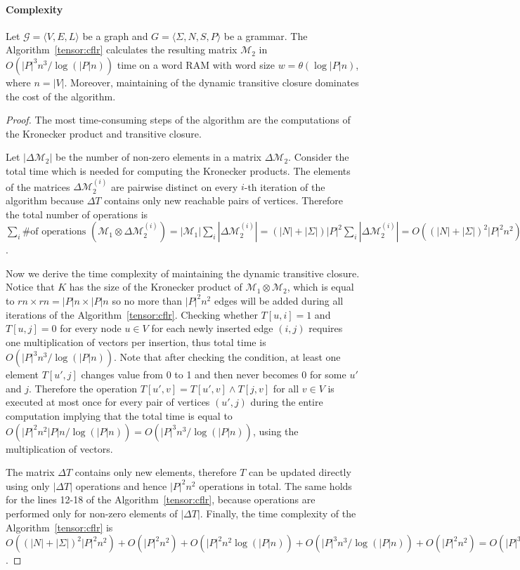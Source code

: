 \paragraph*{Complexity}

\begin{theorem}{}
\label{theorem: subcubic}
    Let $\mathcal{G} = \langle V,E,L \rangle$ be a graph and $G = \langle\Sigma, N, S, P\rangle$ be a grammar.
    The Algorithm~\ref{tensor:cflr} calculates the resulting matrix $\mathcal{M}_2$ in $O({|P|}^3n^3/\log (|P|n))$ time on a word RAM with word size $w= \theta(\log |P|n)$, where $n = |V|$. Moreover, maintaining of the dynamic transitive closure dominates the cost of the algorithm.
\end{theorem}


\begin{proof}
The most time-consuming steps of the algorithm are the computations of the Kronecker product and transitive closure.

 Let $|\Delta\mathcal{M}_2|$ be the number of non-zero elements in a matrix $\Delta\mathcal{M}_2$. Consider the total time which is needed for computing the Kronecker products. The elements of the matrices $\Delta\mathcal{M}_2^{(i)}$ are pairwise distinct on every $i$-th iteration of the algorithm because $\Delta T$ contains only new reachable pairs of vertices.  Therefore the total number of operations is $\sum\limits_i{\text{\# of operations }(\mathcal{M}_1 \otimes \Delta\mathcal{M}_2^{(i)})} = |\mathcal{M}_1| \sum\limits_i {|\Delta\mathcal{M}_2^{(i)}|} = (|N| + |\Sigma|){|P|}^2 \sum\limits_i {|\Delta\mathcal{M}_2^{(i)}|} = O({(|N| + |\Sigma|)}^2{|P|}^2 n^2)$.

Now we derive the time complexity of maintaining the dynamic transitive closure.
Notice that $K$ has the size of the Kronecker product of $\mathcal{M}_1 \otimes \mathcal{M}_2$, which is equal to $r n \times r n = |P|n \times |P|n$ so no more than ${|P|}^2n^2$ edges will be added during all iterations of the Algorithm~\ref{tensor:cflr}.
Checking whether $T[u, i] = 1$ and $T[u, j]=0$ for every node $u \in V$ for each newly inserted edge $(i, j)$ requires one multiplication of vectors per insertion, thus total time is $O({|P|}^3n^3/\log (|P|n))$.
Note that after checking the condition, at least one element $T[u', j]$ changes value from 0 to 1 and then never becomes 0 for some $u'$ and $j$.
Therefore the operation $T[u',v] = T[u', v] \wedge T[j, v]$ for all $v \in V$ is executed at most once for every pair of vertices $(u',j)$ during the entire computation implying that the total time is equal to $O({|P|}^2n^2|P|n/\log (|P|n))=O({|P|}^3n^3/\log (|P|n))$, using the  multiplication of vectors.

The matrix $\Delta T$ contains only new elements, therefore $T$ can be updated directly using only $|\Delta T|$ operations and hence ${|P|}^2n^2$ operations in total.
The same holds for the lines 12-18 of the Algorithm~\ref{tensor:cflr}, because operations are performed only for non-zero elements of $|\Delta T|$.
Finally, the time complexity of the Algorithm~\ref{tensor:cflr} is $O({(|N| + |\Sigma|)}^2{|P|}^2 n^2) + O({|P|}^2n^2) + O({|P|}^2n^2 \log (|P|n)) + O({|P|}^3n^3/\log (|P|n)) + O({|P|}^2n^2)= O({|P|}^3n^3/\log (|P|n))$. 
\end{proof}
